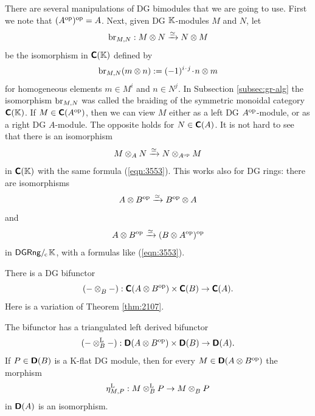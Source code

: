 There are several manipulations of DG bimodules that we are going to use. 
First we note that $(A^{\mathrm{op}})^{\mathrm{op}} = A$.
Next, given DG $\mathbb{K}$-modules $M$ and $N$, let 
\begin{equation} \label{eqn:3550} 
\operatorname{br}_{M, N} : M \otimes N \xrightarrow{\simeq} N \otimes M
\end{equation}
be the isomorphism in $\boldsymbol{\mathsf{C}}(\mathbb{K})$ defined by 
\begin{equation} \label{eqn:3553} 
\operatorname{br}_{M, N}(m \otimes n) := (-1)^{i \mspace{1.5mu}{\cdot}\mspace{1.5mu} j} \mspace{1.5mu}{\cdot}\mspace{1.5mu} n \otimes m
\end{equation}
for homogeneous elements $m \in M^i$ and $n \in N^j$. 
In Subsection \ref{subsec:gr-alg} the isomorphism $\operatorname{br}_{M, N}$ was called 
the braiding of the symmetric monoidal category $\boldsymbol{\mathsf{C}}(\mathbb{K})$.
If $M \in \boldsymbol{\mathsf{C}}(A^{\mathrm{op}})$, then we can view $M$ either as a 
left DG $A^{\mathrm{op}}$-module, or as a right DG $A$-module.
The opposite holds for $N \in \boldsymbol{\mathsf{C}}(A)$. It is not hard to see that there 
is an isomorphism 
\begin{equation} \label{eqn:3551} 
M \otimes_A N \xrightarrow{\simeq} N \otimes_{A^{\mathrm{op}}} M
\end{equation}
in $\boldsymbol{\mathsf{C}}(\mathbb{K})$ with the same formula (\ref{eqn:3553}).
This works also for DG rings: there are isomorphisms 
\begin{equation} \label{eqn:3552} 
A \otimes B^{\mathrm{op}} \xrightarrow{\simeq} B^{\mathrm{op}} \otimes A
\end{equation}
and
\begin{equation} \label{eqn:3554} 
A \otimes B^{\mathrm{op}} \xrightarrow{\simeq} (B \otimes A^{\mathrm{op}})^{\mathrm{op}}
\end{equation}
in $\mathrm{\mathsf{DGRng}} /_{\mspace{-2mu} \mathrm{c}} \mspace{2mu} \mathbb{K}$, with a formulas like (\ref{eqn:3553}). 

There is a DG bifunctor
\begin{equation} \label{eqn:3537}
(- \otimes^{}_{B} -) :  \boldsymbol{\mathsf{C}}(A \otimes B^{\mathrm{op}}) \times \boldsymbol{\mathsf{C}}(B)
\to \boldsymbol{\mathsf{C}}(A)  . 
\end{equation}
Here is a variation of Theorem \ref{thm:2107}.

\begin{prop} \label{prop:3535}
The bifunctor \tup{(\ref{eqn:3537})} has a triangulated left derived bifunctor
\[ (- \otimes^{\mathrm{L}}_{B} -) :
\boldsymbol{\mathsf{D}}(A \otimes B^{\mathrm{op}}) \times \boldsymbol{\mathsf{D}}(B)
\to \boldsymbol{\mathsf{D}}(A) . \]
If $P \in \boldsymbol{\mathsf{D}}(B)$ is a K-flat DG module, then for every 
$M \in \boldsymbol{\mathsf{D}}(A \otimes B^{\mathrm{op}})$
the morphism 
\[ \eta^{\mathrm{L}}_{M, P} : M \otimes^{\mathrm{L}}_{B} P \to M \otimes^{}_{B} P \]
in $\boldsymbol{\mathsf{D}}(A)$ is an isomorphism. 
\end{prop}

